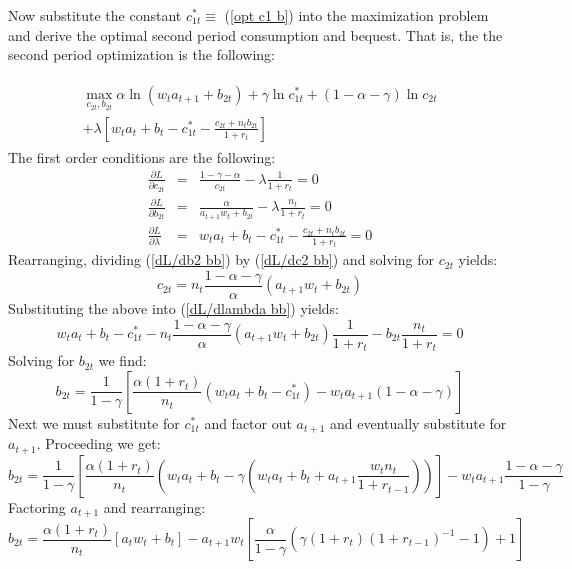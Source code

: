 \documentclass{article}
\begin{document}
Now substitute the constant $c^{*}_{1t} \equiv$ (\ref{opt c1 b}) into the maximization problem and derive the optimal second period consumption and bequest.  That is, the the second period optimization is the following:

\begin{gather}
\begin{split}
\max_{c_{2t}, b_{2t}}\alpha \ln (w_t a_{t+1} + b_{2t})
+ \gamma \ln c^{*}_{1t}
+ (1-\alpha-\gamma) \ln c_{2t}\\
+ \lambda [ w_t a_t + b_t - c^{*}_{1t} - \frac{c_{2t} + n_t b_{2t}}{1+r_t}]
\end{split}
\end{gather}
The first order conditions are the following:
\begin{eqnarray}
\frac{\partial L}{\partial c_{2t}} &=& \frac{1-\gamma-\alpha}{c_{2t}} - \lambda\frac{1}{1+r_t}=0 \label{dL/dc2 bb} \\
\frac{\partial L}{\partial b_{2t}} &=& \frac{\alpha}{a_{t+1}w_t+b_{2t}}-\lambda \frac{n_t}{1+r_t}=0\label{dL/db2 bb}\\
\frac{\partial L}{\partial \lambda} &=& w_t a_t + b_t - c^{*}_{1t} - \frac{c_{2t} + n_t b_{2t}}{1+r_t}=0 \label{dL/dlambda bb}
\end{eqnarray}
Rearranging, dividing (\ref{dL/db2 bb}) by (\ref{dL/dc2 bb}) and solving for $c_{2t}$ yields:
\begin{equation}
c_{2t} = n_t\frac{1-\alpha - \gamma}{\alpha}(a_{t+1} w_t +b_{2t})
\end{equation}
Substituting the above into (\ref{dL/dlambda bb}) yields:
\begin{equation*}
w_t a_t + b_t - c^{*}_{1t} - n_t\frac{1-\alpha - \gamma}{\alpha}(a_{t+1} w_t +b_{2t})\frac{1}{1+r_t}-b_{2t}\frac{n_t}{1+r_t}=0
\end{equation*}
Solving for $b_{2t}$ we find:
\begin{equation*}
b_{2t} = \frac{1}{1-\gamma}[\frac{\alpha(1+r_t)}{n_t}(w_t a_t+ b_t - c^{*}_{1t}) - w_t a_{t+1}(1-\alpha-\gamma)]
\end{equation*}
Next we must substitute for $c^{*}_{1t}$ and factor out $a_{t+1}$ and eventually substitute for $a_{t+1}$.  Proceeding we get:
\begin{equation*}
b_{2t} = \frac{1}{1-\gamma}[\frac{\alpha(1+r_t)}{n_t}(w_t a_t+ b_t - \gamma(w_t a_t + b_t + a_{t+1}\frac{w_t n_t}{1+r_{t-1}}))] - w_t a_{t+1}\frac{1-\alpha-\gamma}{1-\gamma}
\end{equation*}
Factoring $a_{t+1}$ and rearranging:
\begin{equation*}
b_{2t} = \frac{\alpha(1+r_t)}{n_t}[a_t w_t + b_t] - a_{t+1}w_t [\frac{\alpha}{1-\gamma}(\gamma(1+r_t)(1+r_{t-1})^{-1} -1) + 1]
\end{equation*}
\end{document}
